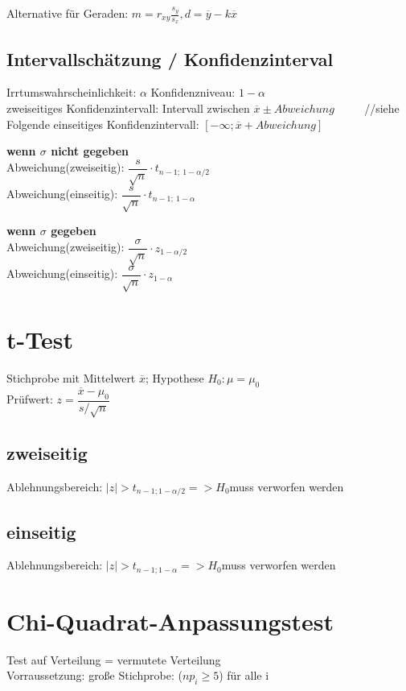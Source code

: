 Alternative für Geraden: $m= r_{xy}\frac{s_y}{s_x}, d = \overline{y}-k\overline{x}$

\subsection*{Intervallschätzung / Konfidenzinterval}
Irrtumswahrscheinlichkeit: $\alpha$ 
Konfidenzniveau: $1-\alpha$\\

zweiseitiges Konfidenzintervall: Intervall zwischen $\overline{x} \pm Abweichung$ ~~~~ //siehe Folgende
einseitiges Konfidenzintervall: $[-\infty; \overline{x} + Abweichung]$

\textbf{wenn $\sigma$ nicht gegeben }\\
Abweichung(zweiseitig): $\dfrac{s}{\sqrt{n}} \cdot t_{n-1;~ 1-\alpha/2}$\\
Abweichung(einseitig): $\dfrac{s}{\sqrt{n}} \cdot t_{n-1;~ 1-\alpha}$

\textbf{wenn $\sigma$ gegeben}\\
Abweichung(zweiseitig): $\dfrac{\sigma}{\sqrt{n}}\cdot  z_{1-\alpha/2}$\\
Abweichung(einseitig): $\dfrac{\sigma}{\sqrt{n}} \cdot z_{1-\alpha}$


\section*{t-Test}
Stichprobe mit Mittelwert $\overline{x}$; Hypothese $H_0: \mu = \mu_0$\\
Prüfwert: $z= \dfrac{\overline{x} - \mu_0}{s/\sqrt{n}}$

\subsection*{zweiseitig}
Ablehnungsbereich: $|z| > t_{n-1;1-\alpha/2} => H_0 $muss verworfen werden 
\subsection*{einseitig}
Ablehnungsbereich: $|z| > t_{n-1;1-\alpha} => H_0 $muss verworfen werden 


\section*{Chi-Quadrat-Anpassungstest}
Test auf Verteilung = vermutete Verteilung\\
Vorraussetzung: große Stichprobe: ($np_i \geq 5$) für alle i

